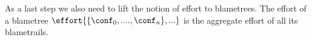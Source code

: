  
As a last step we also need to lift the notion of effort to blametrees.
The effort of a blametree $\effort{\{\conf_0, ...., \conf_n\},...}$ is the
aggregate effort of all its blametrails.
































































































































